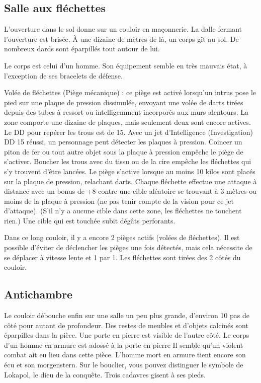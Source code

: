 \documentclass[a4paper,10pt,openany]{book}
\begin{document}
\begin{multicols}{2}
\subsection{Salle aux fléchettes}
\begin{paperbox}{ }
	L’ouverture dans le sol donne sur un couloir en maçonnerie. La dalle fermant l’ouverture est brisée. À une dizaine de mètres de là, un corps gît au
	sol. De nombreux dards sont éparpillés tout autour de lui.
\end{paperbox}
Le corps est celui d’un homme. Son équipement semble en très mauvais état, à l’exception de ses bracelets de défense. 

\begin{quotebox}
	Volée de fléchettes (Piège mécanique) : ce piège est activé lorsqu’un intrus pose le pied sur une plaque de pression dissimulée, envoyant une volée
	de darts tirées depuis des tubes à ressort ou intelligemment incorporés aux murs alentours. La zone comporte une dizaine de plaques, mais seulement
	deux sont encore actives. Le DD pour repérer les trous est de 15. Avec un jet d’Intelligence (Investigation) DD 15 réussi, un personnage peut
	détecter les plaques à pression. Coincer un piton de fer ou tout autre objet sous la plaque à pression empêche le piège de s’activer. Boucher les
	trous avec du tissu ou de la cire empêche les fléchettes qui s’y trouvent d’être lancées. Le piège s’active lorsque au moins 10 kilos sont placés sur
	la plaque de pression, relachant  darts. Chaque fléchette effectue une attaque à distance avec un bonus de +8 contre une cible aléatoire se
	trouvant à 3 mètres ou moins de la plaque à pression (ne pas tenir compte de la vision pour ce jet d’attaque). (S’il n’y a aucune cible dans cette
	zone, les fléchettes ne touchent rien.) Une cible qui est touchée subit  dégâts perforants.
\end{quotebox}

Dans ce long couloir, il y a encore 2 pièges actifs (volées de fléchettes). Il est possible d’éviter de déclencher les pièges une fois détectés, mais
cela nécessite de se déplacer à vitesse lente et 1 par 1. Les fléchettes sont tirées des 2 côtés du couloir.

\subsection{Antichambre}
\begin{paperbox}{ }
	Le couloir débouche enfin sur une salle un peu plus grande, d’environ 10 pas de côté pour autant de profondeur. Des restes de meubles et d’objets
	calcinés sont éparpilles dans la pièce. Une porte en pierre est visible de l’autre côté. Le corps d’un homme en armure est adossé à la porte en
	pierre Il semble qu’un violent combat ait eu lieu dans cette pièce. L’homme mort en armure tient encore son écu et son morgenstern. Sur le bouclier,
	vous pouvez distinguer le symbole de Lokapol, le dieu de la conquête. Trois cadavres gisent à ses pieds.
\end{paperbox}


\end{multicols}
\end{document}
